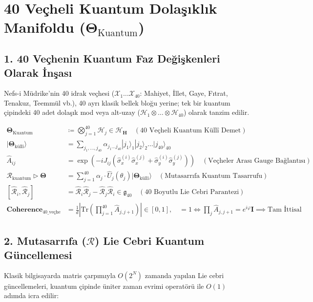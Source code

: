 \documentclass[11pt, a4paper]{article}
\begin{document}
\section{40 Veçheli Kuantum Dolaşıklık Manifoldu ($\mathbf{\Theta}_{\text{Kuantum}}$)}

\subsection{1. 40 Veçhenin Kuantum Faz Değişkenleri Olarak İnşası}
Nefs-i Müdrike'nin 40 idrak veçhesi ($\mathcal{X}_1 \dots \mathcal{X}_{40}$: Mahiyet, İllet, Gaye, Fıtrat, Tenakuz, Teemmül vb.), 40 ayrı klasik bellek bloğu yerine; tek bir kuantum çipindeki 40 adet dolaşık mod veya alt-uzay ($\mathcal{H}_1 \otimes \dots \otimes \mathcal{H}_{40}$) olarak tanzim edilir.

\begin{align}
\mathbf{\Theta}_{\text{Kuantum}} &\coloneqq \bigotimes_{j=1}^{40} \mathcal{H}_j \in \mathcal{H}_{\mathbf{H}} \quad (\text{40 Veçheli Kuantum Küllî Demet}) \\
|\mathbf{\Theta}_{\text{küllî}}\rangle &= \sum_{j_1, \dots, j_{40}} \alpha_{j_1 \dots j_{40}} |j_1\rangle_1 |j_2\rangle_2 \dots |j_{40}\rangle_{40} \\
\hat{A}_{ij} &= \exp\left( -i J_{ij} (\hat{\sigma}_x^{(i)} \hat{\sigma}_x^{(j)} + \hat{\sigma}_y^{(i)} \hat{\sigma}_y^{(j)}) \right) \quad (\text{Veçheler Arası Gauge Bağlantısı}) \\
\mathcal{R}_{\text{kuantum}} \triangleright \mathbf{\Theta} &= \sum_{j=1}^{40} \alpha_j \cdot \hat{U}_j(\theta_j) |\mathbf{\Theta}_{\text{küllî}}\rangle \quad (\text{Mutasarrıfa Kuantum Tasarrufu}) \\
[\hat{\mathcal{R}}_i, \hat{\mathcal{R}}_j] &= \hat{\mathcal{R}}_i \hat{\mathcal{R}}_j - \hat{\mathcal{R}}_j \hat{\mathcal{R}}_i \in \mathfrak{g}_{40} \quad (\text{40 Boyutlu Lie Cebri Parantezi}) \\
\mathbf{Coherence}_{\text{40\_veçhe}} &= \frac{1}{d} \left| \text{Tr}\left( \prod_{j=1}^{40} \hat{A}_{j, j+1} \right) \right| \in [0, 1], \quad = 1 \iff \prod_j \hat{A}_{j,j+1} = e^{i\varphi}\mathbf{I} \implies \text{Tam İttisal}
\end{align}

\subsection{2. Mutasarrıfa ($\mathcal{R}$) Lie Cebri Kuantum Güncellemesi}
Klasik bilgisayarda matris çarpımıyla $O(2^N)$ zamanda yapılan Lie cebri güncellemeleri, kuantum çipinde üniter zaman evrimi operatörü ile $O(1)$ adımda icra edilir:
\end{document}
